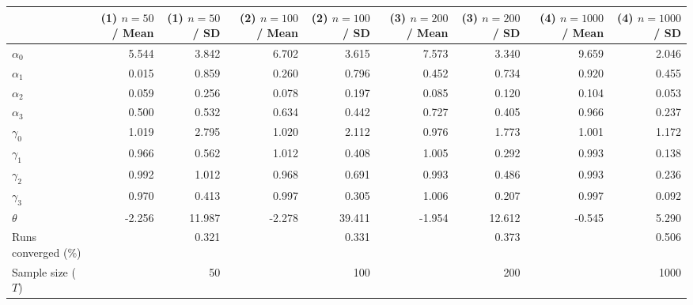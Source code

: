 
\begin{tabular}[t]{lrrrrrrrr}
\toprule
  & (1) $n=50$ / Mean & (1) $n=50$ / SD & (2) $n=100$ / Mean & (2) $n=100$ / SD & (3) $n=200$ / Mean & (3) $n=200$ / SD & (4) $n=1000$ / Mean & (4) $n=1000$ / SD\\
\midrule
$\alpha_{0}$ & 5.544 & 3.842 & 6.702 & 3.615 & 7.573 & 3.340 & 9.659 & 2.046\\
$\alpha_{1}$ & 0.015 & 0.859 & 0.260 & 0.796 & 0.452 & 0.734 & 0.920 & 0.455\\
$\alpha_{2}$ & 0.059 & 0.256 & 0.078 & 0.197 & 0.085 & 0.120 & 0.104 & 0.053\\
$\alpha_{3}$ & 0.500 & 0.532 & 0.634 & 0.442 & 0.727 & 0.405 & 0.966 & 0.237\\
$\gamma_{0}$ & 1.019 & 2.795 & 1.020 & 2.112 & 0.976 & 1.773 & 1.001 & 1.172\\
$\gamma_{1}$ & 0.966 & 0.562 & 1.012 & 0.408 & 1.005 & 0.292 & 0.993 & 0.138\\
$\gamma_{2}$ & 0.992 & 1.012 & 0.968 & 0.691 & 0.993 & 0.486 & 0.993 & 0.236\\
$\gamma_{3}$ & 0.970 & 0.413 & 0.997 & 0.305 & 1.006 & 0.207 & 0.997 & 0.092\\
$\theta$ & -2.256 & 11.987 & -2.278 & 39.411 & -1.954 & 12.612 & -0.545 & 5.290\\
Runs converged (\%) &  & 0.321 &  & 0.331 &  & 0.373 &  & 0.506\\
Sample size ($T$) &  & 50 &  & 100 &  & 200 &  & 1000\\
\bottomrule
\end{tabular}

